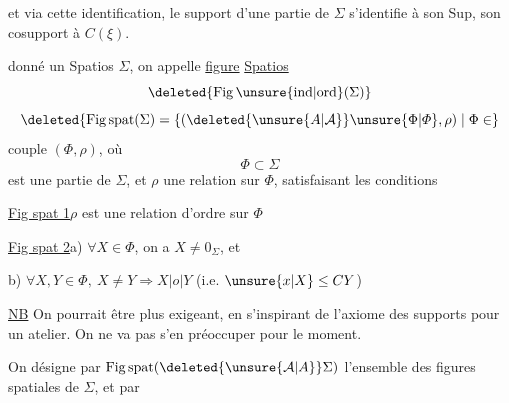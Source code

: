 et via cette identification, le support d'une partie  de $\Sigma$ s'identifie à son Sup\inserted{$\xi$}, son cosupport à $C(\xi)$.


 donné un Spatios $\Sigma$, on  appelle \uline{figure} \uline{} \uline{Spatios}
\[
\deleted{\mathrm{Fig}\,\unsure{\mathrm{ind}|\mathrm{ord}}(\Sigma)}
\]
\[
\deleted{\mathrm{Fig}\,\mathrm{spat}(\Sigma)=\{(\deleted{\unsure{A|\mathcal A}}\unsure{\Phi|\varPhi},\rho)\mid\Phi\in}
\]
  couple $(\Phi,\rho)$, où
\[
\Phi\subset\Sigma
\]
est une partie de $\Sigma$, et $\rho$ une relation sur $\Phi$, satisfaisant les conditions

\uline{Fig spat 1}\quad $\rho$ est une relation d'ordre sur $\Phi$

\uline{Fig spat 2}\quad a) $\forall X\in\Phi$, on a $X\ne0_\Sigma$, et

\hspace*{4em}b) $\forall X,Y\in\Phi,\ X\ne Y\Longrightarrow X\mathrel{|o|}Y$ (i.e. $\unsure{x|X}\leq CY$)

\uline{NB} On pourrait être plus exigeant, en s'inspirant de l'axiome des supports pour un atelier. On ne va pas s'en préoccuper pour le moment.

On désigne par $\mathrm{Fig}\,\mathrm{spat}(\deleted{\unsure{\mathcal A|A}}\Sigma)$ l'ensemble des figures spatiales de $\Sigma$, et par
